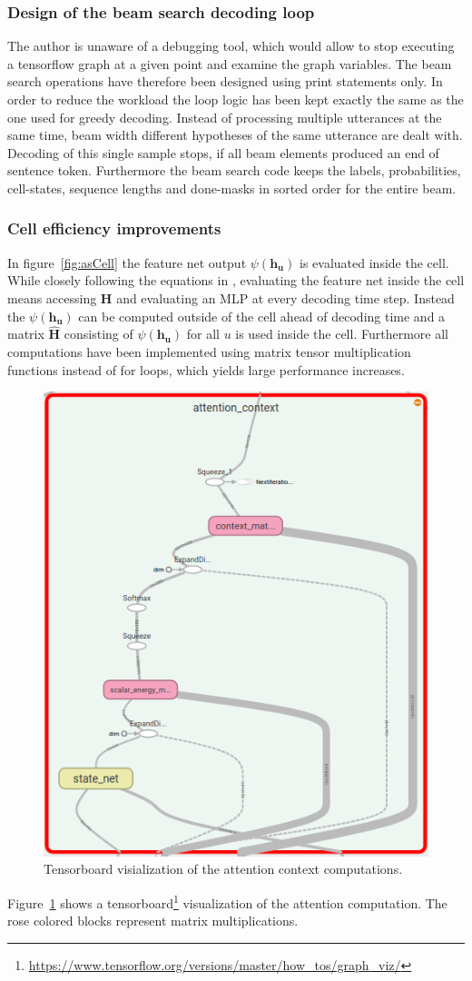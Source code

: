 \subsubsection{Design of the beam search decoding loop}
The author is unaware of a debugging tool, which would allow to stop executing a tensorflow graph at a given point and examine the graph variables. The beam search operations have therefore been designed using print statements only. 
In order to reduce the workload the loop logic has been kept exactly the same as the one used for greedy decoding. Instead of processing multiple utterances at the same time, beam width different hypotheses of the same utterance are dealt with. Decoding of this single sample stops, if all beam elements produced an end of sentence token. 
Furthermore the beam search code keeps the labels, probabilities, cell-states, sequence lengths and done-masks in sorted order for the entire beam. 

\subsubsection{Cell efficiency improvements}
In figure~\ref{fig:asCell} the feature net output $\psi(\mathbf{h_u})$ is evaluated inside the cell. While closely following the equations in \cite{Chan2015}, evaluating the feature net inside the cell means accessing $\mathbf{H}$ and evaluating an MLP at every decoding time step. Instead the $\psi(\mathbf{h_u})$ can be computed outside of the cell ahead of decoding time and a matrix $\hat{\mathbf{H}}$ consisting of $\psi(\mathbf{h_u})$ for all $u$ is used inside the cell.
Furthermore all computations have been implemented using matrix tensor multiplication functions instead of for loops, which yields large performance increases. 
\begin{figure}
\centering
\includegraphics[width=0.49\linewidth]{../png/attention_context}
\caption{Tensorboard visialization of the attention context computations.}
\label{fig:attention_context}
\end{figure}
Figure~\ref*{fig:attention_context} shows a tensorboard\footnote{\url{https://www.tensorflow.org/versions/master/how_tos/graph_viz/}} visualization of the attention computation. The rose colored blocks represent matrix multiplications.


